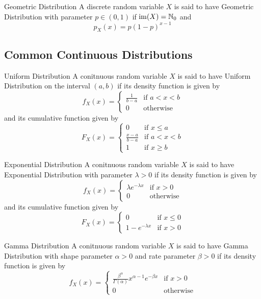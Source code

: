 \documentclass[a4paper]{article}
\begin{document}
\begin{defn}{Geometric Distribution}{} A discrete random variable $X$ is said to have Geometric Distribution with parameter $p\in(0,1)$ if $\operatorname{im}(X)=\mathbb{N}_0$ and $$p_X(x)=p(1-p)^{x-1}$$
\end{defn}


\subsection{Common Continuous Distributions}
\begin{defn}{Uniform Distribution}{} A conitnuous random variable $X$ is said to have Uniform Distribution on the interval $(a,b)$ if its density function is given by $$f_X(x)=\begin{cases}
\frac{1}{b-a} & \text{if $a<x<b$}\\
0 & \text{otherwise}
\end{cases}$$ and its cumulative function given by $$F_X(x)=\begin{cases}
0 & \text{if $x\leq a$}\\
\frac{x-a}{b-a} & \text{if $a<x<b$}\\
1 & \text{if $x\geq b$}
\end{cases}$$
\end{defn}

\begin{defn}{Exponential Distribution}{} A conitnuous random variable $X$ is said to have Exponential Distribution with parameter $\lambda>0$ if its density function is given by $$f_X(x)=\begin{cases}
\lambda e^{-\lambda x} & \text{if $x>0$}\\
0 & \text{otherwise}
\end{cases}$$ and its cumulative function given by $$F_X(x)=\begin{cases}
0 & \text{if $x\leq 0$}\\
1-e^{-\lambda x} & \text{if $x>0$}
\end{cases}$$
\end{defn}

\begin{defn}{Gamma Distribution}{} A conitnuous random variable $X$ is said to have Gamma Distribution with shape parameter $\alpha>0$ and rate parameter $\beta>0$ if its density function is given by $$f_X(x)=\begin{cases}
\frac{\beta^\alpha}{\Gamma(\alpha)}x^{\alpha-1}e^{-\beta x} & \text{if $x>0$}\\
0 & \text{otherwise}
\end{cases}$$
\end{defn}
\end{document}
